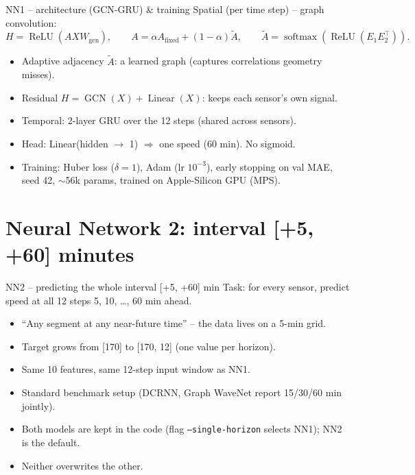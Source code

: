 \documentclass[aspectratio=169]{beamer}
\begin{document}
\begin{frame}{NN1 -- architecture (GCN-GRU) \& training}
\small
Spatial (per time step) -- graph convolution:
\[
H = \operatorname{ReLU}(A X W_{\mathrm{gcn}}), \qquad
A = \alpha A_{\mathrm{fixed}} + (1-\alpha)\tilde{A}, \qquad
\tilde{A} = \operatorname{softmax}(\operatorname{ReLU}(E_1E_2^\top)).
\]

\begin{itemize}
  \item Adaptive adjacency $\tilde{A}$: a learned graph (captures correlations geometry misses).
  \item Residual $H = \operatorname{GCN}(X) + \operatorname{Linear}(X)$: keeps each sensor's own signal.
  \item Temporal: 2-layer GRU over the 12 steps (shared across sensors).
  \item Head: Linear(hidden $\to$ 1) $\Rightarrow$ one speed (60 min). No sigmoid.
  \item Training: Huber loss ($\delta = 1$), Adam (lr $10^{-3}$), early stopping on val MAE,
  seed 42, $\sim$56k params, trained on Apple-Silicon GPU (MPS).
\end{itemize}
\end{frame}

\section[NN2]{Neural Network 2: interval [+5, +60] minutes}

\begin{frame}{NN2 -- predicting the whole interval [+5, +60] min}
\small
Task: for every sensor, predict speed at all 12 steps 5, 10, \ldots, 60 min ahead.

\begin{itemize}
  \item ``Any segment at any near-future time'' -- the data lives on a 5-min grid.
  \item Target grows from [170] to [170, 12] (one value per horizon).
  \item Same 10 features, same 12-step input window as NN1.
  \item Standard benchmark setup (DCRNN, Graph WaveNet report 15/30/60 min jointly).
  \item Both models are kept in the code (flag \texttt{--single-horizon} selects NN1); NN2 is the default.
  \item Neither overwrites the other.
\end{itemize}
\end{frame}
\end{document}
